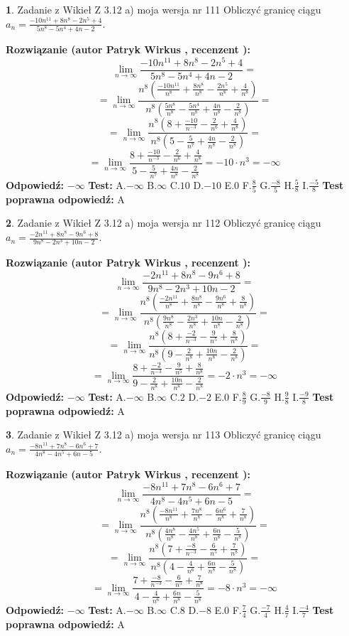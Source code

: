 \documentclass[12pt, a4paper]{article}
\theoremstyle{definition} %
\newtheorem{zad}{}
\newcommand{\zadStart}[1]{\begin{zad}#1\newline}
\newcommand{\zadStop}{\end{zad}}
\newcommand{\rozwStart}[2]{\noindent \textbf{Rozwiązanie (autor #1 , recenzent #2): }\newline}
\newcommand{\rozwStop}{\newline}
\newcommand{\odpStart}{\noindent \textbf{Odpowiedź:}\newline}
\newcommand{\odpStop}{\newline}
\newcommand{\testStart}{\noindent \textbf{Test:}\newline}
\newcommand{\testStop}{\newline}
\newcommand{\kluczStart}{\noindent \textbf{Test poprawna odpowiedź:}\newline}
\newcommand{\kluczStop}{\newline}
\begin{document}
\zadStart{Zadanie z Wikieł Z 3.12 a) moja wersja nr 111}
Obliczyć granicę ciągu $a_{n}=\frac{-10n^{11}+8n^{8}-2n^{5}+4}{5n^{8}-5n^{4}+4n-2}$.
\zadStop
\rozwStart{Patryk Wirkus}{}
$$\lim\limits_{n\to\infty}\frac{-10n^{11}+8n^{8}-2n^{5}+4}{5n^{8}-5n^{4}+4n-2}=$$
$$=\lim\limits_{n\to\infty}\frac{n^{8}\left(\frac{-10n^{11}}{n^{8}}+\frac{8n^{8}}{n^{8}}-\frac{2n^{5}}{n^{8}}+\frac{4}{n^{8}}\right)}{n^{8}\left(\frac{5n^{8}}{n^{8}}-\frac{5n^{4}}{n^{8}}+\frac{4n}{n^{8}}-\frac{2}{n^{8}}\right)}=$$
$$=\lim\limits_{n\to\infty}\frac{n^{8}\left(8+\frac{-10}{n^{-3}}-\frac{2}{n^{6}}+\frac{4}{n^{8}}\right)}
{n^{8}\left(5-\frac{5}{n^{7}}+\frac{4n}{n^{8}}-\frac{2}{n^{8}}\right)}=$$
$$=\lim\limits_{n\to\infty}\frac{8+\frac{-10}{n^{-3}}-\frac{2}{n^{6}}+\frac{4}{n^{8}}}{5-\frac{5}{n^{7}}+\frac{4n}{n^{8}}-\frac{2}{n^{8}}}=-10\cdot n^{3} = -\infty$$
\rozwStop
\odpStart
$-\infty$
\odpStop
\testStart
A.$-\infty$
B.$\infty$
C.$10$
D.$-10$
E.$0$
F.$\frac{8}{5}$
G.$\frac{-8}{5}$
H.$\frac{5}{8}$
I.$\frac{-5}{8}$
\testStop
\kluczStart
A
\kluczStop



\zadStart{Zadanie z Wikieł Z 3.12 a) moja wersja nr 112}
Obliczyć granicę ciągu $a_{n}=\frac{-2n^{11}+8n^{8}-9n^{6}+8}{9n^{8}-2n^{3}+10n-2}$.
\zadStop
\rozwStart{Patryk Wirkus}{}
$$\lim\limits_{n\to\infty}\frac{-2n^{11}+8n^{8}-9n^{6}+8}{9n^{8}-2n^{3}+10n-2}=$$
$$=\lim\limits_{n\to\infty}\frac{n^{8}\left(\frac{-2n^{11}}{n^{8}}+\frac{8n^{8}}{n^{8}}-\frac{9n^{6}}{n^{8}}+\frac{8}{n^{8}}\right)}{n^{8}\left(\frac{9n^{8}}{n^{8}}-\frac{2n^{3}}{n^{8}}+\frac{10n}{n^{8}}-\frac{2}{n^{8}}\right)}=$$
$$=\lim\limits_{n\to\infty}\frac{n^{8}\left(8+\frac{-2}{n^{-3}}-\frac{9}{n^{5}}+\frac{8}{n^{8}}\right)}
{n^{8}\left(9-\frac{2}{n^{8}}+\frac{10n}{n^{8}}-\frac{2}{n^{8}}\right)}=$$
$$=\lim\limits_{n\to\infty}\frac{8+\frac{-2}{n^{-3}}-\frac{9}{n^{5}}+\frac{8}{n^{8}}}{9-\frac{2}{n^{8}}+\frac{10n}{n^{8}}-\frac{2}{n^{8}}}=-2\cdot n^{3} = -\infty$$
\rozwStop
\odpStart
$-\infty$
\odpStop
\testStart
A.$-\infty$
B.$\infty$
C.$2$
D.$-2$
E.$0$
F.$\frac{8}{9}$
G.$\frac{-8}{9}$
H.$\frac{9}{8}$
I.$\frac{-9}{8}$
\testStop
\kluczStart
A
\kluczStop



\zadStart{Zadanie z Wikieł Z 3.12 a) moja wersja nr 113}
Obliczyć granicę ciągu $a_{n}=\frac{-8n^{11}+7n^{8}-6n^{6}+7}{4n^{8}-4n^{5}+6n-5}$.
\zadStop
\rozwStart{Patryk Wirkus}{}
$$\lim\limits_{n\to\infty}\frac{-8n^{11}+7n^{8}-6n^{6}+7}{4n^{8}-4n^{5}+6n-5}=$$
$$=\lim\limits_{n\to\infty}\frac{n^{8}\left(\frac{-8n^{11}}{n^{8}}+\frac{7n^{8}}{n^{8}}-\frac{6n^{6}}{n^{8}}+\frac{7}{n^{8}}\right)}{n^{8}\left(\frac{4n^{8}}{n^{8}}-\frac{4n^{5}}{n^{8}}+\frac{6n}{n^{8}}-\frac{5}{n^{8}}\right)}=$$
$$=\lim\limits_{n\to\infty}\frac{n^{8}\left(7+\frac{-8}{n^{-3}}-\frac{6}{n^{5}}+\frac{7}{n^{8}}\right)}
{n^{8}\left(4-\frac{4}{n^{6}}+\frac{6n}{n^{8}}-\frac{5}{n^{8}}\right)}=$$
$$=\lim\limits_{n\to\infty}\frac{7+\frac{-8}{n^{-3}}-\frac{6}{n^{5}}+\frac{7}{n^{8}}}{4-\frac{4}{n^{6}}+\frac{6n}{n^{8}}-\frac{5}{n^{8}}}=-8\cdot n^{3} = -\infty$$
\rozwStop
\odpStart
$-\infty$
\odpStop
\testStart
A.$-\infty$
B.$\infty$
C.$8$
D.$-8$
E.$0$
F.$\frac{7}{4}$
G.$\frac{-7}{4}$
H.$\frac{4}{7}$
I.$\frac{-4}{7}$
\testStop
\kluczStart
A
\kluczStop
\end{document}
